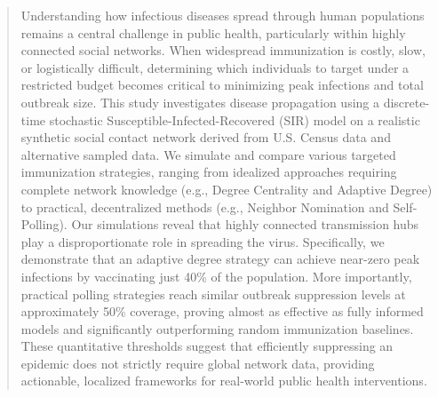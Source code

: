 \documentclass[9pt,twocolumn,twoside]{pnas-new}
\begin{document}
\begin{abstract}
Understanding how infectious diseases spread through human populations remains a central challenge in public health, particularly within highly connected social networks. When widespread immunization is costly, slow, or logistically difficult, determining which individuals to target under a restricted budget becomes critical to minimizing peak infections and total outbreak size. This study investigates disease propagation using a discrete-time stochastic Susceptible-Infected-Recovered (SIR) model on a realistic synthetic social contact network derived from U.S. Census data and alternative sampled data. We simulate and compare various targeted immunization strategies, ranging from idealized approaches requiring complete network knowledge (e.g., Degree Centrality and Adaptive Degree) to practical, decentralized methods (e.g., Neighbor Nomination and Self-Polling). Our simulations reveal that highly connected transmission hubs play a disproportionate role in spreading the virus. Specifically, we demonstrate that an adaptive degree strategy can achieve near-zero peak infections by vaccinating just 40\% of the population. More importantly, practical polling strategies reach similar outbreak suppression levels at approximately 50\% coverage, proving almost as effective as fully informed models and significantly outperforming random immunization baselines. These quantitative thresholds suggest that efficiently suppressing an epidemic does not strictly require global network data, providing actionable, localized frameworks for real-world public health interventions.
\end{abstract}


\maketitle
\thispagestyle{firststyle}
\end{document}
